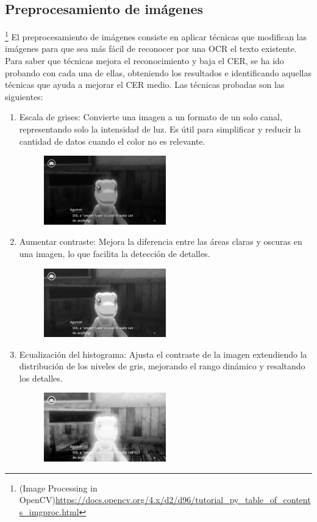 \subsection{Preprocesamiento de imágenes}
\footnote{(Image Processing in OpenCV)\url {https://docs.opencv.org/4.x/d2/d96/tutorial_py_table_of_contents_imgproc.html}}
El preprocesamiento de imágenes consiste en aplicar técnicas que modifican las imágenes para que sea más fácil de reconocer por una OCR el texto existente.
Para saber que técnicas mejora el reconocimiento y baja el CER, se ha ido probando con cada una de ellas, obteniendo los resultados e identificando aquellas técnicas que ayuda a mejorar el CER medio.
Las técnicas probadas son las siguientes:

\begin{enumerate}
	\item Escala de grises:
	Convierte una imagen a un formato de un solo canal, representando solo la intensidad de luz. Es útil para simplificar y reducir la cantidad de datos cuando el color no es relevante.
	\begin{figure}[H]
		\centering
		\includegraphics[width = 0.5\textwidth]{Imagenes/Preprocesado/1.png}
	\end{figure}
	\item Aumentar contraste: 
	Mejora la diferencia entre las áreas claras y oscuras en una imagen, lo que facilita la detección de detalles.
		\begin{figure}[H]
		\centering
		\includegraphics[width = 0.5\textwidth]{Imagenes/Preprocesado/2.png}
	\end{figure}
	\item Ecualización del histograma:
	Ajusta el contraste de la imagen extendiendo la distribución de los niveles de gris, mejorando el rango dinámico y resaltando los detalles.
		\begin{figure}[H]
		\centering
		\includegraphics[width = 0.5\textwidth]{Imagenes/Preprocesado/3.png}
	\end{figure}
	

\end{enumerate}
